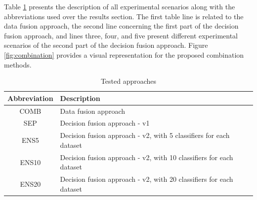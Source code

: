 \documentclass[conference]{IEEEtran}
\begin{document}
Table \ref{tab:approaches} presents the description of all experimental scenarios along with the abbreviations used over the results section. The first table line is related to the data fusion approach, the second line concerning the first part of the decision fusion approach, and lines three, four, and five present different experimental scenarios of the second part of the decision fusion approach.
Figure \ref{fig:combination} provides a visual representation for the proposed combination methods.

\begin{table}[H]
    \centering
    \caption{Tested approaches}
    \label{tab:approaches}
    \begin{tabular}{|c|p{6cm}|}
        \hline
         \textbf{Abbreviation} & \textbf{Description} \\ \hline
         COMB & Data fusion approach \\ \hline
         SEP & Decision fusion approach - v1 \\ \hline
         ENS5 & Decision fusion approach - v2,  with 5 classifiers for each dataset \\ \hline
         ENS10 & Decision fusion approach - v2,  with 10 classifiers for each dataset \\ \hline
         ENS20 & Decision fusion approach - v2,  with 20 classifiers for each dataset \\ \hline
    \end{tabular}
\end{table}
\end{document}
